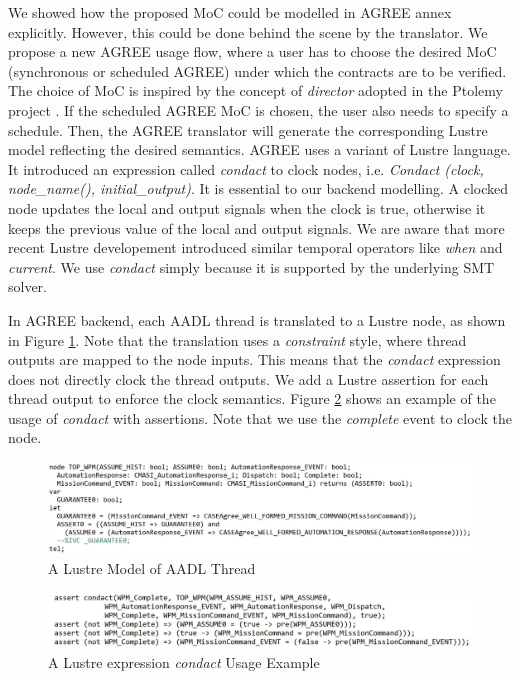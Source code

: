 We showed how the proposed MoC could be modelled in AGREE annex explicitly. However, this could be done behind the scene by the translator.
We propose a new AGREE usage flow, where a user has to choose the desired MoC (synchronous or scheduled AGREE) under which the contracts are to be verified. The choice of MoC is inspired by the concept of \emph{director} adopted in the Ptolemy project \cite{Ptolemy}. If the scheduled AGREE MoC is chosen, the user also needs to specify a schedule. Then, the AGREE translator will generate the corresponding Lustre model reflecting the desired semantics. AGREE uses a variant of Lustre \cite{GAO2008111} language. It introduced an expression called \emph{condact} to clock nodes, i.e. \emph{Condact (clock, node\_name(), initial\_output)}. It is essential to our backend modelling. A clocked node updates the local and output signals when the clock is true, otherwise it keeps the previous value of the local and output signals. We are aware that more recent Lustre developement introduced similar temporal operators like \emph{when} and \emph{current}. We use \emph{condact} simply because it is supported by the underlying SMT solver.

In AGREE backend, each AADL thread is translated to a Lustre node, as shown in Figure \ref{WPMlustre}. Note that the translation uses a \emph{constraint} style, where thread outputs are mapped to the node inputs. This means that the \emph{condact} expression does not directly clock the thread outputs. We add a Lustre assertion for each thread output to enforce the clock semantics. Figure \ref{lustreAsync} shows an example of the usage of \emph{condact} with assertions. Note that we use the \emph{complete} event to clock the node.  

\begin{figure}[ht!]
\centering
\includegraphics[width=120mm]{wpmLustre2.jpg}
\caption{A Lustre Model of AADL Thread \label{WPMlustre}}
\end{figure}

\begin{figure}[ht!]
\centering
\includegraphics[width=120mm]{lustreAsync4.jpg}
\caption{A Lustre expression \emph{condact} Usage Example\label{lustreAsync}}
\end{figure}

